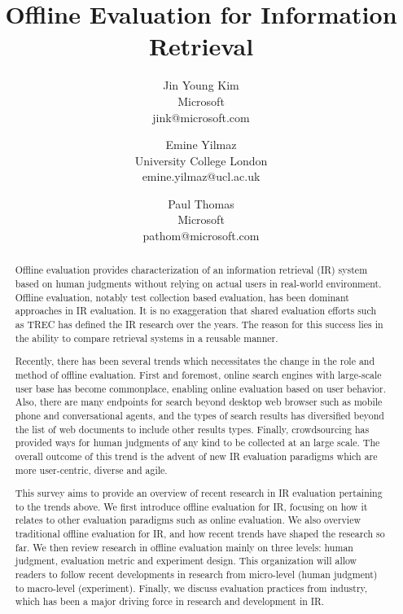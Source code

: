 \documentclass[openany]{now} %
\title{Offline Evaluation for Information Retrieval}
\author{
	Jin Young Kim \\
	Microsoft \\
	jink@microsoft.com
	\and
	Emine Yilmaz \\
	University College London \\
	emine.yilmaz@ucl.ac.uk
	\and
	Paul Thomas \\
	Microsoft \\
	pathom@microsoft.com
}
\begin{document}

\frontmatter  %

\maketitle

\tableofcontents

\mainmatter

\begin{abstract}
Offline evaluation provides characterization of an information retrieval (IR) system based on human judgments without relying on actual users in real-world environment. Offline evaluation, notably test collection based evaluation, has been dominant approaches in IR evaluation. It is no exaggeration that shared evaluation efforts such as TREC has defined the IR research over the years. The reason for this success lies in the ability to compare retrieval systems in a reusable manner.

Recently, there has been several trends which necessitates the change in the role and method of offline evaluation. First and foremost, online search engines with large-scale user base has become commonplace, enabling online evaluation based on user behavior. Also, there are many endpoints for search beyond desktop web browser such as mobile phone and conversational agents, and the types of search results has diversified beyond the list of web documents to include other results types. Finally, crowdsourcing has provided ways for human judgments of any kind to be collected at an large scale. The overall outcome of this trend is the advent of new IR evaluation paradigms which are more user-centric, diverse and agile.

This survey aims to provide an overview of recent research in IR evaluation pertaining to the trends above. We first introduce offline evaluation for IR, focusing on how it relates to other evaluation paradigms such as online evaluation. We also overview traditional offline evaluation for IR, and how recent trends have shaped the research so far. We then review research in offline evaluation mainly on three levels: human judgment, evaluation metric and experiment design. This organization will allow readers to follow recent developments in research from micro-level (human judgment) to macro-level (experiment). Finally, we discuss evaluation practices from industry, which has been a major driving force in research and development in IR.
	

\end{abstract}
\end{document}
